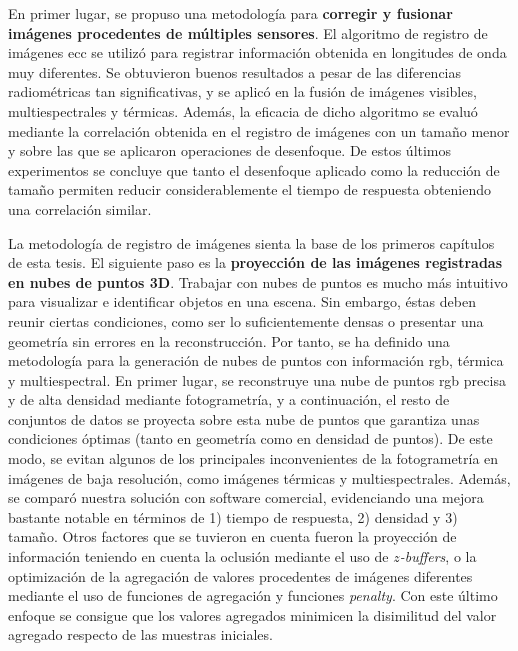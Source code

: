 En primer lugar, se propuso una metodología para \textbf{corregir y fusionar imágenes procedentes de múltiples sensores}. El algoritmo de registro de imágenes \acrshort{ecc} se utilizó para registrar información obtenida en longitudes de onda muy diferentes. Se obtuvieron buenos resultados a pesar de las diferencias radiométricas tan significativas, y se aplicó en la fusión de imágenes visibles, multiespectrales y térmicas. Además, la eficacia de dicho algoritmo se evaluó mediante la correlación obtenida en el registro de imágenes con un tamaño menor y sobre las que se aplicaron operaciones de desenfoque. De estos últimos experimentos se concluye que tanto el desenfoque aplicado como la reducción de tamaño permiten reducir considerablemente el tiempo de respuesta obteniendo una correlación similar.

La metodología de registro de imágenes sienta la base de los primeros capítulos de esta tesis. El siguiente paso es la \textbf{proyección de las imágenes registradas en nubes de puntos 3D}. Trabajar con nubes de puntos es mucho más intuitivo para visualizar e identificar objetos en una escena. Sin embargo, éstas deben reunir ciertas condiciones, como ser lo suficientemente densas o presentar una geometría sin errores en la reconstrucción. Por tanto, se ha definido una metodología para la generación de nubes de puntos con información \acrshort{rgb}, térmica y multiespectral. En primer lugar, se reconstruye una nube de puntos \acrshort{rgb} precisa y de alta densidad mediante fotogrametría, y a continuación, el resto de conjuntos de datos se proyecta sobre esta nube de puntos que garantiza unas condiciones óptimas (tanto en geometría como en densidad de puntos). De este modo, se evitan algunos de los principales inconvenientes de la fotogrametría en imágenes de baja resolución, como imágenes térmicas y multiespectrales. Además, se comparó nuestra solución con software comercial, evidenciando una mejora bastante notable en términos de 1) tiempo de respuesta, 2) densidad y 3) tamaño. Otros factores que se tuvieron en cuenta fueron la proyección de información teniendo en cuenta la oclusión mediante el uso de \textit{$z$-buffers}, o la optimización de la agregación de valores procedentes de imágenes diferentes mediante el uso de funciones de agregación y funciones \textit{penalty}. Con este último enfoque se consigue que los valores agregados minimicen la disimilitud del valor agregado respecto de las muestras iniciales. 

